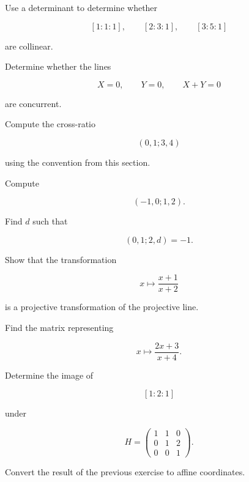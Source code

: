 \begin{exercise}[2]
Use a determinant to determine whether

\[
[1:1:1],\qquad
[2:3:1],\qquad
[3:5:1]
\]

are collinear.
\end{exercise}

\begin{exercise}[2]
Determine whether the lines

\[
X=0,\qquad
Y=0,\qquad
X+Y=0
\]

are concurrent.
\end{exercise}

\begin{exercise}[2]
Compute the cross-ratio

\[
(0,1;3,4)
\]

using the convention from this section.
\end{exercise}

\begin{exercise}[2]
Compute

\[
(-1,0;1,2).
\]
\end{exercise}

\begin{exercise}[3]
Find \(d\) such that

\[
(0,1;2,d)=-1.
\]
\end{exercise}

\begin{exercise}[2]
Show that the transformation

\[
x\mapsto\frac{x+1}{x+2}
\]

is a projective transformation of the projective line.
\end{exercise}

\begin{exercise}[2]
Find the matrix representing

\[
x\mapsto\frac{2x+3}{x+4}.
\]
\end{exercise}

\begin{exercise}[2]
Determine the image of

\[
[1:2:1]
\]

under

\[
H=
\begin{pmatrix}
1&1&0\\
0&1&2\\
0&0&1
\end{pmatrix}.
\]
\end{exercise}

\begin{exercise}[3]
Convert the result of the previous exercise to affine coordinates.
\end{exercise}

